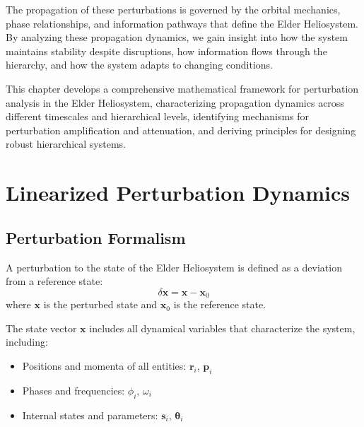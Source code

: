 The propagation of these perturbations is governed by the orbital mechanics, phase relationships, and information pathways that define the Elder Heliosystem. By analyzing these propagation dynamics, we gain insight into how the system maintains stability despite disruptions, how information flows through the hierarchy, and how the system adapts to changing conditions.

This chapter develops a comprehensive mathematical framework for perturbation analysis in the Elder Heliosystem, characterizing propagation dynamics across different timescales and hierarchical levels, identifying mechanisms for perturbation amplification and attenuation, and deriving principles for designing robust hierarchical systems.

\section{Linearized Perturbation Dynamics}

\subsection{Perturbation Formalism}

\begin{definition}
A perturbation to the state of the Elder Heliosystem is defined as a deviation from a reference state:
\begin{equation}
\delta\mathbf{x} = \mathbf{x} - \mathbf{x}_0
\end{equation}
where $\mathbf{x}$ is the perturbed state and $\mathbf{x}_0$ is the reference state.
\end{definition}

The state vector $\mathbf{x}$ includes all dynamical variables that characterize the system, including:
\begin{itemize}
    \item Positions and momenta of all entities: $\mathbf{r}_i$, $\mathbf{p}_i$
    \item Phases and frequencies: $\phi_i$, $\omega_i$
    \item Internal states and parameters: $\mathbf{s}_i$, $\boldsymbol{\theta}_i$
\end{itemize}

